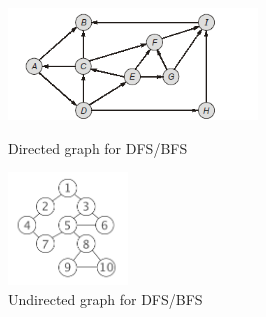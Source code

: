 \documentclass[a4paper,12pt]{article}
\begin{document}
\begin{enumerate}
\begin{figure}[!htb]
\centering
\begin{minipage}{.5\textwidth}
\centering
\includegraphics[width=2.6in]{figs/part2-directed-graph-dfs.png}
\caption{Directed graph for DFS/BFS}
\label{fig:part2-directed-graph-dfs}
\end{minipage}%
\begin{minipage}{0.5\textwidth}
\centering
\includegraphics[width=1.25in]{figs/part2-undirected-graph-dfs.png}
\caption{Undirected graph for DFS/BFS}
\label{fig:part2-undirected-graph-dfs}
\end{minipage}
\end{figure}






\end{enumerate}
\end{document}
